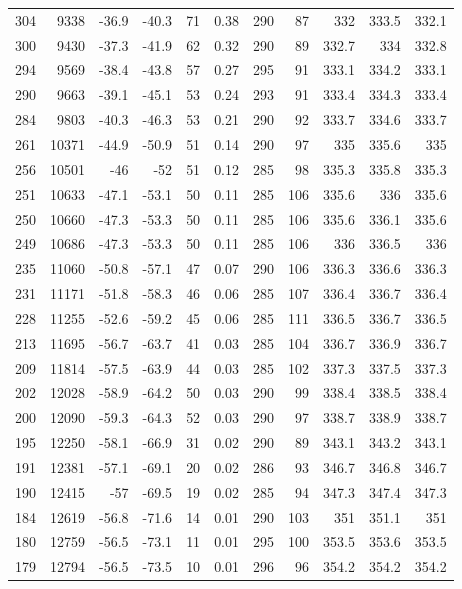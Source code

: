 \documentclass{article}
\begin{document}
\begin{longtable}{r|r|r|r|r|r|r|r|r|r|r}
304 & 9338 & -36.9 & -40.3 & 71 & 0.38 & 290 & 87 & 332 & 333.5 & 332.1 \\
300 & 9430 & -37.3 & -41.9 & 62 & 0.32 & 290 & 89 & 332.7 & 334 & 332.8 \\
294 & 9569 & -38.4 & -43.8 & 57 & 0.27 & 295 & 91 & 333.1 & 334.2 & 333.1 \\
290 & 9663 & -39.1 & -45.1 & 53 & 0.24 & 293 & 91 & 333.4 & 334.3 & 333.4 \\
284 & 9803 & -40.3 & -46.3 & 53 & 0.21 & 290 & 92 & 333.7 & 334.6 & 333.7 \\
261 & 10371 & -44.9 & -50.9 & 51 & 0.14 & 290 & 97 & 335 & 335.6 & 335 \\
256 & 10501 & -46 & -52 & 51 & 0.12 & 285 & 98 & 335.3 & 335.8 & 335.3 \\
251 & 10633 & -47.1 & -53.1 & 50 & 0.11 & 285 & 106 & 335.6 & 336 & 335.6 \\
250 & 10660 & -47.3 & -53.3 & 50 & 0.11 & 285 & 106 & 335.6 & 336.1 & 335.6 \\
249 & 10686 & -47.3 & -53.3 & 50 & 0.11 & 285 & 106 & 336 & 336.5 & 336 \\
235 & 11060 & -50.8 & -57.1 & 47 & 0.07 & 290 & 106 & 336.3 & 336.6 & 336.3 \\
231 & 11171 & -51.8 & -58.3 & 46 & 0.06 & 285 & 107 & 336.4 & 336.7 & 336.4 \\
228 & 11255 & -52.6 & -59.2 & 45 & 0.06 & 285 & 111 & 336.5 & 336.7 & 336.5 \\
213 & 11695 & -56.7 & -63.7 & 41 & 0.03 & 285 & 104 & 336.7 & 336.9 & 336.7 \\
209 & 11814 & -57.5 & -63.9 & 44 & 0.03 & 285 & 102 & 337.3 & 337.5 & 337.3 \\
202 & 12028 & -58.9 & -64.2 & 50 & 0.03 & 290 & 99 & 338.4 & 338.5 & 338.4 \\
200 & 12090 & -59.3 & -64.3 & 52 & 0.03 & 290 & 97 & 338.7 & 338.9 & 338.7 \\
195 & 12250 & -58.1 & -66.9 & 31 & 0.02 & 290 & 89 & 343.1 & 343.2 & 343.1 \\
191 & 12381 & -57.1 & -69.1 & 20 & 0.02 & 286 & 93 & 346.7 & 346.8 & 346.7 \\
190 & 12415 & -57 & -69.5 & 19 & 0.02 & 285 & 94 & 347.3 & 347.4 & 347.3 \\
184 & 12619 & -56.8 & -71.6 & 14 & 0.01 & 290 & 103 & 351 & 351.1 & 351 \\
180 & 12759 & -56.5 & -73.1 & 11 & 0.01 & 295 & 100 & 353.5 & 353.6 & 353.5 \\
179 & 12794 & -56.5 & -73.5 & 10 & 0.01 & 296 & 96 & 354.2 & 354.2 & 354.2 \\

\end{longtable}
\end{document}
